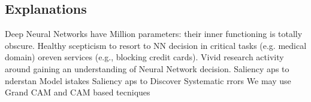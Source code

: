 \subsection{Explanations}
Deep Neural Networks have
Million parameters: their inner
functioning is totally obscure.
Healthy scepticism to resort to NN
decision in critical tasks (e.g.
medical domain) oreven services
(e.g., blocking credit cards).
Vivid research activity around
gaining an understanding of
Neural Network decision.
Saliency aps to nderstan Model istakes
Saliency aps to Discover Systematic rrors
We may use Grand CAM and CAM based tecniques